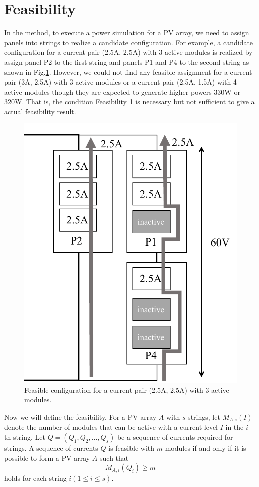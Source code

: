 \documentclass[conference]{pvsctran}
\newcommand{\michiko}{\textcolor{black}}
\begin{document}
\section{Feasibility}
In the method\cite{orozco2016optimized}, to execute a power simulation for a PV array, we need to assign panels into strings to realize a candidate configuration. 
For example, a candidate configuration for a current pair (2.5A, 2.5A) with 3 active modules is realized by assign panel P2  to the first string and panels P1 and P4 to the second string as shown in Fig.\ref{fig:feasible-configuration}. 
However, we could not find \michiko{any} feasible assignment for a current pair (3A, 2.5A) with 3 active modules or a current pair (2.5A, 1.5A) with 4 active modules though they are expected to generate higher powers 330W or 320W. 
That is, the condition Feasibility 1 is necessary but not sufficient to give a actual feasibility result.

\begin{figure}[b]
    \centering
    \includegraphics[width=0.6\linewidth]{../fig/feasible-configuration-vertical.pdf}
    \caption{Feasible configuration for a current pair (2.5A, 2.5A) with 3 active modules.}
    \label{fig:feasible-configuration}
\end{figure}

Now we will define the feasibility. For a PV array $A$ with $s$ strings, let $M_{A,i}(I)$ denote the number of modules that can be active with a current level $I$ in the $i$-th string.
Let $Q = (Q_{1},Q_{2},\ldots ,Q_{s})$ be a sequence of currents required for strings. 
A sequence of currents $Q$ is feasible with $m$ modules if and only if it is possible to form a PV array $A$ such that 
\begin{equation}
M_{A,i}(Q_{i}) \geq m
\end{equation}
holds for each string $i (1 \leq i \leq s)$.
\end{document}
